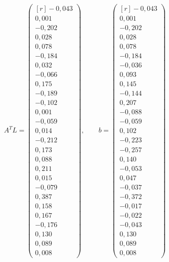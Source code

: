 \begin{equation} \label{eq:eq3.34}	%
	A^TL = \begin{pmatrix*}[r] 
		 -0,043 \\ 0,001 \\ -0,202 \\ 0,028 \\ 0,078 \\ -0,184 \\%
		  0,032 \\ -0,066 \\ 0,175 \\ -0,189 \\ -0,102 \\ 0,001 \\%
		 -0,059 \\ 0,014 \\ -0,212 \\ 0,173 \\ 0,088 \\ 0,211 \\%
		  0,015 \\ -0,079 \\ 0,387 \\ 0,158 \\ 0,167 \\ -0,176 \\%
		  0,130 \\ 0,089 \\ 0,008 %
	 \end{pmatrix*},  \qquad%
	b = \begin{pmatrix*}[r]   
		-0,043 \\ 0,001 \\ -0,202 \\ 0,028 \\ 0,078 \\ -0,184 \\%
		-0,036 \\ 0,093 \\ 0,145 \\ -0,144 \\ 0,207 \\ -0,088 \\%
		-0,059 \\ 0,102 \\ -0,223 \\ -0,257 \\ 0,140 \\ -0,053 \\%
		 0,047 \\ -0,037 \\ -0,372 \\ -0,017 \\ -0,022 \\ -0,043 \\%
		 0,130 \\ 0,089 \\ 0,008 %
	\end{pmatrix*}
\end{equation} 
 
